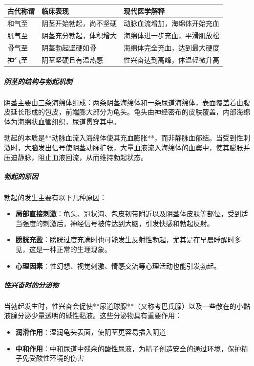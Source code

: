 \begin{enumerate}
\begin{center}
\begin{tabular}{p{3cm} p{5cm} p{4cm}}
\toprule
\textbf{古代称谓} & \textbf{临床表现} & \textbf{现代医学解释} \\
\midrule
和气至 & 阴茎开始勃起，尚不坚硬 & 动脉血流增加，海绵体开始充血 \\
肌气至 & 阴茎充分勃起，体积增大 & 海绵体进一步充血，平滑肌放松 \\
骨气至 & 阴茎勃起坚硬如骨 & 海绵体完全充血，达到最大硬度 \\
神气至 & 阴茎坚硬且有温热感 & 性兴奋达到高峰，体温轻微升高 \\
\bottomrule
\end{tabular}
\end{center}

\subparagraph{阴茎的结构与勃起机制}

阴茎主要由三条海绵体组成：两条阴茎海绵体和一条尿道海绵体，表面覆盖着由腹皮延长形成的包皮，前端膨大部分为龟头。龟头由神经密布的皮肤覆盖，内部海绵体为海绵状血管组织，尿道贯穿其中。

勃起的本质是**动脉血流入海绵体使其充血膨胀**，而非静脉血郁结。当受到性刺激时，大脑发出信号使阴茎动脉扩张，大量血液流入海绵体的血窦中，使其膨胀并压迫静脉，阻止血液回流，从而维持勃起状态。

\subparagraph{勃起的原因}

勃起的发生主要有以下几种原因：
\begin{itemize}
    \item \textbf{局部直接刺激}：龟头、冠状沟、包皮韧带附近以及阴茎体皮肤等部位，受到适当强度的刺激后，神经信号被传达到大脑，引发快感和勃起反射。
    \item \textbf{膀胱充盈}：膀胱过度充满时也可能发生反射性勃起，尤其是在早晨睡醒时多见，这是一种正常的生理现象。
    \item \textbf{心理因素}：性幻想、视觉刺激、情感交流等心理活动也能引发勃起。
\end{itemize}

\subparagraph{性兴奋时的分泌物}

当勃起发生时，性兴奋会促使**尿道球腺**（又称考巴氏腺）以及一些散在的小黏液腺分泌少量透明的碱性黏液。这些分泌物具有重要作用：
\begin{itemize}
    \item \textbf{润滑作用}：湿润龟头表面，使阴茎更容易插入阴道
    \item \textbf{中和作用}：中和尿道中残余的酸性尿液，为精子创造安全的通过环境，保护精子免受酸性环境的伤害
\end{itemize}


\end{enumerate}
